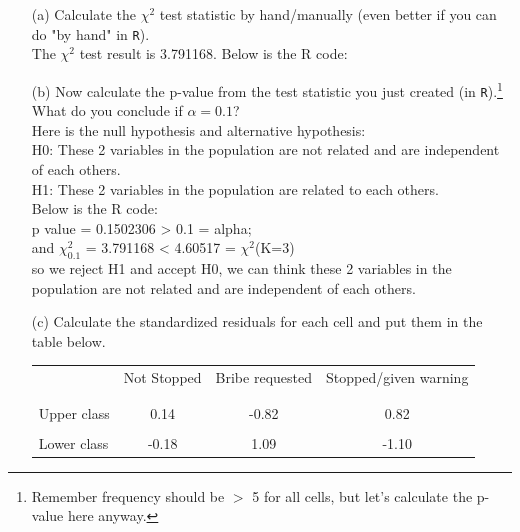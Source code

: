 \documentclass[12pt,letterpaper]{article}
\begin{document}
\begin{enumerate}
	
	\item [(a)]
	Calculate the $\chi^2$ test statistic by hand/manually (even better if you can do "by hand" in \texttt{R}).\\
	
	The $\chi^2$ test result is 3.791168. Below is the R code: 
	
	\newpage
	\item [(b)]
	Now calculate the p-value from the test statistic you just created (in \texttt{R}).\footnote{Remember frequency should be $>$ 5 for all cells, but let's calculate the p-value here anyway.}  What do you conclude if $\alpha = 0.1$?\\
	
	Here is the null hypothesis and alternative hypothesis: \\
	H0:  These 2 variables in the population are not related and are independent of each others. \\
	H1: These 2 variables in the population are related to each others. \\
	Below is the R code: \\
	
	p value = 0.1502306 > 0.1 = alpha; \\
	and $\chi^2_{0.1}$ = 3.791168 < 4.60517 = $\chi^2$(K=3) \\
	
	so we reject H1 and accept H0, we can think these 2 variables in the population are not related and are independent of each others.
	\newpage
	\item [(c)] Calculate the standardized residuals for each cell and put them in the table below.
	\vspace{1cm}
	
	\begin{table}[h]
		\centering
		\begin{tabular}{l | c c c }
			& Not Stopped & Bribe requested & Stopped/given warning \\
			\\[-1.8ex] 
			\hline \\[-1.8ex]
			Upper class  &0.14  &-0.82  &0.82  \\
			\\
			Lower class &-0.18  &1.09   &-1.10  \\


\end{tabular}
\end{table}
\end{enumerate}
\end{document}
